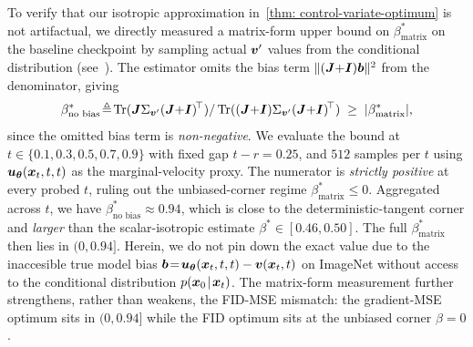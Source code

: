 To verify that our isotropic approximation in~\cref{thm: control-variate-optimum} is not artifactual, we directly measured a matrix-form upper bound on $\beta^{\ast}_{\text{matrix}}$ on the baseline checkpoint by sampling actual ${\bm{v}}^{\prime}$ values from the conditional distribution (see~). The estimator omits the bias term $\|({\bm{J}}{+}{\bm{I}}){\bm{b}}\|^{2}$ from the denominator, giving
\begin{equation}
    \beta^{\ast}_{\text{no bias}}\!\triangleq\!\operatorname{Tr}({\bm{J}}\Sigma_{{\bm{v}}^{\prime}}({\bm{J}}{+}{\bm{I}})^{\!\top})/\operatorname{Tr}(({\bm{J}}{+}{\bm{I}})\Sigma_{{\bm{v}}^{\prime}}({\bm{J}}{+}{\bm{I}})^{\!\top})\;\geq\;|\beta^{\ast}_{\text{matrix}}|,
\end{equation}
since the omitted bias term is \emph{non-negative}. We evaluate the bound at $t\!\in\!\{0.1,0.3,0.5,0.7,0.9\}$ with fixed gap $t-r\!=\!0.25$, and $512$ samples per $t$ using ${\bm{u}}_{{\bm{\theta}}}({\bm{x}}_{t},t,t)$ as the marginal-velocity proxy. The numerator is \emph{strictly positive} at every probed $t$, ruling out the unbiased-corner regime $\beta^{\ast}_{\text{matrix}}\!\le\!0$. Aggregated across $t$, we have $\beta^{\ast}_{\text{no bias}}\!\approx\!0.94$, which is close to the deterministic-tangent corner and \emph{larger} than the scalar-isotropic estimate $\beta^{\ast}\!\in\![0.46,0.50]$. The full $\beta^{\ast}_{\text{matrix}}$ then lies in $(0,0.94]$. Herein, we do not pin down the exact value due to the inaccesible true model bias ${\bm{b}}\!=\!{\bm{u}}_{{\bm{\theta}}}({\bm{x}}_{t},t,t)-{\bm{v}}({\bm{x}}_{t},t)$ on ImageNet without access to the conditional distribution $p({\bm{x}}_{0}\!\mid\!{\bm{x}}_{t})$. The matrix-form measurement further strengthens, rather than weakens, the FID-MSE mismatch: the gradient-MSE optimum sits in $(0,0.94]$ while the FID optimum sits at the unbiased corner $\beta\!=\!0$.
